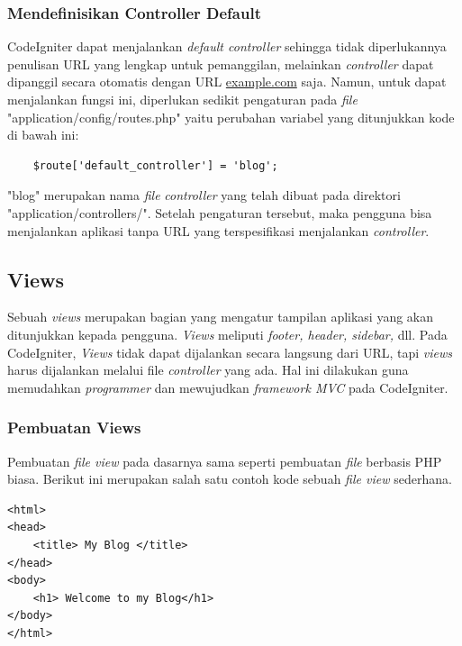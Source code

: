 \subsubsection{Mendefinisikan Controller Default}
\label{subsub: defaulController}

	CodeIgniter dapat menjalankan \textit{default controller} sehingga tidak diperlukannya penulisan URL yang lengkap untuk pemanggilan, melainkan \textit{controller} dapat dipanggil secara otomatis dengan URL \url{example.com} saja. Namun, untuk dapat menjalankan fungsi ini, diperlukan sedikit pengaturan pada \textit{file} "application/config/routes.php" yaitu perubahan variabel yang ditunjukkan kode di bawah ini:
	
	\begin{lstlisting}
	$route['default_controller'] = 'blog';
	\end{lstlisting}
	
	"blog" merupakan nama \textit{file} \textit{controller} yang telah dibuat pada direktori "application/controllers/". Setelah pengaturan tersebut, maka pengguna bisa menjalankan aplikasi tanpa URL yang terspesifikasi menjalankan \textit{controller}.
	
	\subsection{Views}
	\label{sub: views}
	
	Sebuah \textit{views} merupakan bagian yang mengatur tampilan aplikasi yang akan ditunjukkan kepada pengguna. \textit{Views} meliputi \textit{footer, header, sidebar,} dll.
	Pada CodeIgniter, \textit{Views} tidak dapat dijalankan secara langsung dari URL, tapi \textit{views} harus dijalankan melalui file \textit{controller} yang ada. Hal ini dilakukan guna memudahkan \textit{programmer} dan mewujudkan \textit{framework MVC} pada CodeIgniter.
	
	\subsubsection{Pembuatan Views}
	\label{subsub: pembuatanView}
	
	Pembuatan \textit{file view} pada dasarnya sama seperti pembuatan \textit{file} berbasis PHP biasa. Berikut ini merupakan salah satu contoh kode sebuah \textit{file view} sederhana.
	
	\begin{lstlisting}
<html>
<head>
	<title> My Blog </title>
</head>
<body>
	<h1> Welcome to my Blog</h1>
</body>
</html>
	\end{lstlisting}
	
